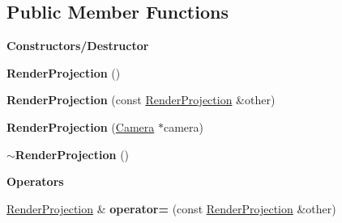 \subsection*{Public Member Functions}
\begin{Indent}\textbf{ Constructors/\+Destructor}\par
\begin{DoxyCompactItemize}
\item 
\mbox{\label{classrev_1_1_render_projection_af87e8ebac613f1df2b5361ee170bf07d}} 
{\bfseries Render\+Projection} ()
\item 
\mbox{\label{classrev_1_1_render_projection_a740fba25a93cc338b5159328ff9b8e86}} 
{\bfseries Render\+Projection} (const \mbox{\hyperlink{classrev_1_1_render_projection}{Render\+Projection}} \&other)
\item 
\mbox{\label{classrev_1_1_render_projection_aee5942efeefeef47f828cb4c29289d33}} 
{\bfseries Render\+Projection} (\mbox{\hyperlink{classrev_1_1_camera}{Camera}} $\ast$camera)
\item 
\mbox{\label{classrev_1_1_render_projection_ad870d837379a516714d439f2c9eeca44}} 
{\bfseries $\sim$\+Render\+Projection} ()
\end{DoxyCompactItemize}
\end{Indent}
\begin{Indent}\textbf{ Operators}\par
\begin{DoxyCompactItemize}
\item 
\mbox{\label{classrev_1_1_render_projection_a67c7b64759ae2fc720004f640097cc7f}} 
\mbox{\hyperlink{classrev_1_1_render_projection}{Render\+Projection}} \& {\bfseries operator=} (const \mbox{\hyperlink{classrev_1_1_render_projection}{Render\+Projection}} \&other)
\end{DoxyCompactItemize}
\end{Indent}
